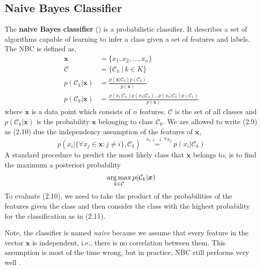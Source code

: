 \subsection{Naive Bayes Classifier}\label{section:nbc}
  The \textbf{naive Bayes classifier} () is a probabilistic classifier.
  It describes a set of algorithms capable of learning to infer a class given a set of features and labels.
  The NBC is defined as,
  \begin{align}
    \boldsymbol{x} &= \{x_1, x_2, \dots, x_n\} \\
    \mathcal{C} &= \{\mathcal{C}_k \: | \: k \in K \} \\
    p(\mathcal{C}_k|\boldsymbol{x}) &= \frac{p(\boldsymbol{x} |\mathcal{C}_k) p(\mathcal{C}_k)} {p(\boldsymbol{x})} \\
    p(\mathcal{C}_k|\boldsymbol{x}) &= \frac{p(x_1 |\mathcal{C}_k)
                                         p(x_2 |\mathcal{C}_k) \dots
                                         p(x_n |\mathcal{C}_k)
                                         p(\mathcal{C}_k)}{p(\boldsymbol{x})}
  \end{align}
  where $\boldsymbol{x}$ is a data point which consists of $n$ features.
  $\mathcal{C}$ is the set of all classes and $p(\mathcal{C}_k|\boldsymbol{x})$ is the probability $\boldsymbol{x}$ belonging to class $\mathcal{C}_k$.
  We are allowed to write (2.9) as (2.10) due the independency assumption of the features of $\boldsymbol{x}$,
   \[p(x_i| \{\forall x_j \in \boldsymbol{x} : j \neq i \}, \mathcal{C}_k) \overset{\, \,\,\,x_i\perp\!\!\!\perp \forall x_j}{=} p(x_i|\mathcal{C}_k)\]
  A standard procedure to predict the most likely class that $\boldsymbol{x}$ belongs to, is to find the maximum a posteriori probability
  \begin{gather}
    \operatorname*{arg\,max}_{k \in \mathcal{C}} p(\mathcal{C}_k|\boldsymbol{x})
  \end{gather}
  To evaluate (2.10), we need to take the product of the probabilities of the features given the class and then consider the class with the highest probability for the classification as in (2.11).

  Note,  the classifier is named \emph{naive} because we assume that every feature in the vector $\boldsymbol{x}$ is independent, i.e., there is no correlation between them.
  This assumption is most of the time wrong, but in practice, NBC still performs very well \citep{Rish2001}.


